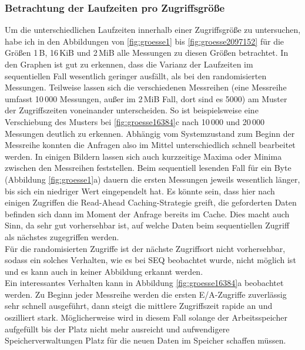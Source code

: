 \documentclass[
	twoside,
	12pt,
	a4paper,
	BCOR10mm,
	DIV14,
	listof=totoc,
	bibliography=totoc,
	headsepline
]{scrreprt}
\begin{document}
\subsubsection{Betrachtung der Laufzeiten pro Zugriffsgröße}
Um die unterschiedlichen Laufzeiten innerhalb einer Zugriffsgröße zu untersuchen, habe ich in den Abbildungen von \ref{fig:groesse1} bis \ref{fig:groesse2097152} für die Größen 1\,B, 16\,KiB und 2\,MiB alle Messungen zu diesen Größen betrachtet.
In den Graphen ist gut zu erkennen, dass die Varianz der Laufzeiten im sequentiellen Fall wesentlich geringer ausfällt, als bei den randomisierten Messungen.
Teilweise lassen sich die verschiedenen Messreihen (eine Messreihe umfasst 10\,000 Messungen, außer im 2\,MiB Fall, dort sind es 5000) am Muster der Zugriffszeiten voneinander unterscheiden.
So ist beispielsweise eine Verschiebung des Musters bei \ref{fig:groesse16384}c nach 10\,000 und 20\,000 Messungen deutlich zu erkennen.
Abhängig vom Systemzustand zum Beginn der Messreihe konnten die Anfragen also im Mittel unterschiedlich schnell bearbeitet werden.
In einigen Bildern lassen sich auch kurzzeitige Maxima oder Minima zwischen den Messreihen feststellen.
Beim sequentiell lesenden Fall für ein Byte (Abbildung \ref{fig:groesse1}a) dauern die ersten Messungen jeweils wesentlich länger, bis sich ein niedriger Wert eingependelt hat. Es könnte sein, dass hier nach einigen Zugriffen die Read-Ahead Caching-Strategie greift, die geforderten Daten befinden sich dann im Moment der Anfrage bereits im Cache. Dies macht auch Sinn, da sehr gut vorhersehbar ist, auf welche Daten beim sequentiellen Zugriff als nächstes zugegriffen werden.\\
Für die randomisierten Zugriffe ist der nächste Zugriffsort nicht vorhersehbar, sodass ein solches Verhalten, wie es bei SEQ beobachtet wurde, nicht möglich ist und es kann auch in keiner Abbildung erkannt werden.\\
Ein interessantes Verhalten kann in Abbildung \ref{fig:groesse16384}a beobachtet werden.
Zu Beginn jeder Messreihe werden die ersten E/A-Zugriffe zuverlässig sehr schnell ausgeführt, dann steigt die mittlere Zugriffszeit rapide an und oszilliert stark.
Möglicherweise wird in diesem Fall solange der Arbeitsspeicher aufgefüllt bis der Platz nicht mehr ausreicht und aufwendigere Speicherverwaltungen Platz für die neuen Daten im Speicher schaffen müssen.
\end{document}
